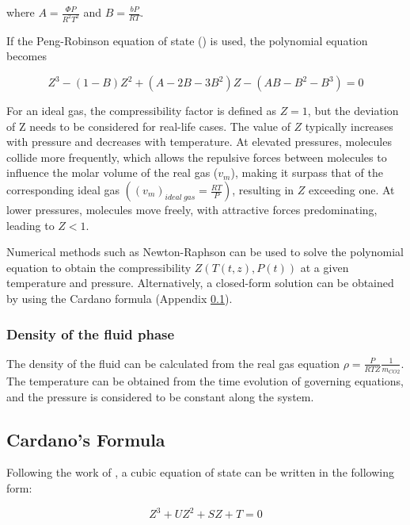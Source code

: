 \documentclass[a4paper,fleqn]{cas-dc}
\begin{document}
where $A=\frac{\Phi P}{R^2T^2}$ and $B=\frac{bP}{RT}$.

If the Peng-Robinson equation of state (\citet{Peng1976}) is used, the polynomial equation becomes

{\footnotesize
	\begin{equation}
		\label{EQ:Peng_Robinson_Polynomial}
		Z^3 - (1-B)Z^2+(A-2B-3B^2)Z -(AB-B^2-B^3) = 0
\end{equation} }

For an ideal gas, the compressibility factor is defined as $Z = 1$, but the deviation of Z needs to be considered for real-life cases. The value of $Z$ typically increases with pressure and decreases with temperature. At elevated pressures, molecules collide more frequently, which allows the repulsive forces between molecules to influence the molar volume of the real gas ($v_m$), making it surpass that of the corresponding ideal gas $\left( \left(v_m\right)_{ideal~gas} = \frac{RT}{P} \right)$, resulting in $Z$ exceeding one. At lower pressures, molecules move freely, with attractive forces predominating, leading to $Z < 1$.

Numerical methods such as Newton-Raphson can be used to solve the polynomial equation to obtain the compressibility $Z\left(T(t,z), P(t)\right)$ at a given temperature and pressure. Alternatively, a closed-form solution can be obtained by using the Cardano formula (Appendix \ref{CH: Cardano}).

\subsubsection{Density of the fluid phase} \label{subsubsec: Fluid density}

The density of the fluid can be calculated from the real gas equation $\rho = \frac{P}{RTZ} \frac{1}{m_{CO2}}$. The temperature can be obtained from the time evolution of governing equations, and the pressure is considered to be constant along the system. 


\subsection{Cardano's Formula} \label{CH: Cardano}

Following the work of \citet{Gmehling2019}, a cubic equation of state can be written in the following form:

{\footnotesize
	\begin{equation}
		Z^3 + UZ^2+ SZ + T = 0
	\end{equation}
}
\end{document}
